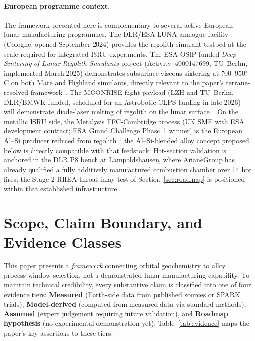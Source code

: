 \documentclass[11pt,a4paper]{article}
\begin{document}
\paragraph{European programme context.}
The framework presented here is complementary to several active European lunar-manufacturing programmes. The DLR/ESA LUNA analogue facility (Cologne, opened September 2024) provides the regolith-simulant testbed at the scale required for integrated ISRU experiments. The ESA OSIP-funded \emph{Deep Sintering of Lunar Regolith Simulants} project (Activity~4000147699, TU~Berlin, implemented March 2025) demonstrates subsurface viscous sintering at 700--950$^\circ$C on both Mare and Highland simulants, directly relevant to the paper's terrane-resolved framework~\cite{ESADeepSintering2025}. The MOONRISE flight payload (LZH and TU~Berlin, DLR/BMWK funded, scheduled for an Astrobotic CLPS landing in late 2026) will demonstrate diode-laser melting of regolith on the lunar surface~\cite{MOONRISE2024}. On the metallic ISRU side, the Metalysis FFC-Cambridge process (UK SME with ESA development contract; ESA Grand Challenge Phase~1 winner) is the European Al--Si producer reduced from regolith~\cite{Lomax2020}; the Al--Si-blended alloy concept proposed below is directly compatible with that feedstock. Hot-section validation is anchored in the DLR P8 bench at Lampoldshausen, where ArianeGroup has already qualified a fully additively manufactured combustion chamber over 14 hot fires; the Stage-2 RHEA throat-inlay test of Section~\ref{sec:roadmap} is positioned within that established infrastructure.

\section{Scope, Claim Boundary, and Evidence Classes}

This paper presents a \emph{framework} connecting orbital geochemistry to alloy process-window selection, not a demonstrated lunar manufacturing capability. To maintain technical credibility, every substantive claim is classified into one of four evidence tiers: \textbf{Measured} (Earth-side data from published sources or SPARK trials), \textbf{Model-derived} (computed from measured data via standard methods), \textbf{Assumed} (expert judgement requiring future validation), and \textbf{Roadmap hypothesis} (no experimental demonstration yet). Table~\ref{tab:evidence} maps the paper's key assertions to these tiers.
\end{document}

